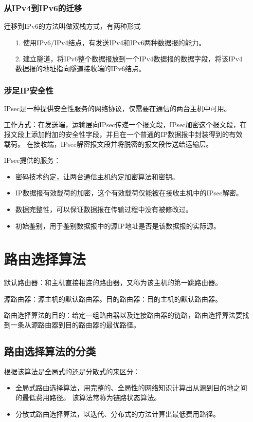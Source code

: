 \documentclass[a4paper,left=2.5cm,right=2.5cm,11pt]{article}
\begin{document}
\subsubsection{从IPv4到IPv6的迁移}
	迁移到IPv6的方法叫做双栈方式，有两种形式
	\begin{itemize}
		\item[1.] 使用IPv6/IPv4结点，有发送IPv4和IPv6两种数据报的能力。
		\item[2.] 建立隧道，将IPv6整个数据报放到一个IPv4数据报的数据字段，将该IPv4数据报的地址指向隧道接收端的IPv6结点。
	\end{itemize}

\subsubsection{涉足IP安全性}
	IPsec是一种提供安全性服务的网络协议，仅需要在通信的两台主机中可用。\par

	工作方式：在发送端，运输层向IPsec传递一个报文段，IPsec加密这个报文段，在报文段上添加附加的安全性字段，并且在一个普通的IP数据报中封装得到的有效载荷。
	在接收端，IPsec解密报文段并将脱密的报文段传送给运输层。\par

	IPsec提供的服务：
	\begin{itemize}
		\item 密码技术约定，让两台通信主机约定加密算法和密钥。
		\item IP数据报有效载荷的加密，这个有效载荷仅能被在接收主机中的IPsec解密。
		\item 数据完整性，可以保证数据报在传输过程中没有被修改过。
		\item 初始鉴别，用于鉴别数据报中的源IP地址是否是该数据报的实际源。
	\end{itemize}

\section{路由选择算法}
	默认路由器：和主机直接相连的路由器，又称为该主机的第一跳路由器。\par

	源路由器：源主机的默认路由器。目的路由器：目的主机的默认路由器。\par

	路由选择算法的目的：给定一组路由器以及连接路由器的链路，路由选择算法要找到一条从源路由器到目的路由器的最优路径。\par

\subsection{路由选择算法的分类}
	根据该算法是全局式的还是分散式的来区分：
	\begin{itemize}
		\item 全局式路由选择算法，用完整的、全局性的网络知识计算出从源到目的地之间的最低费用路径。
			  该算法常称为链路状态算法。

		\item 分散式路由选择算法，以迭代、分布式的方法计算出最低费用路径。
	\end{itemize}
\end{document}
